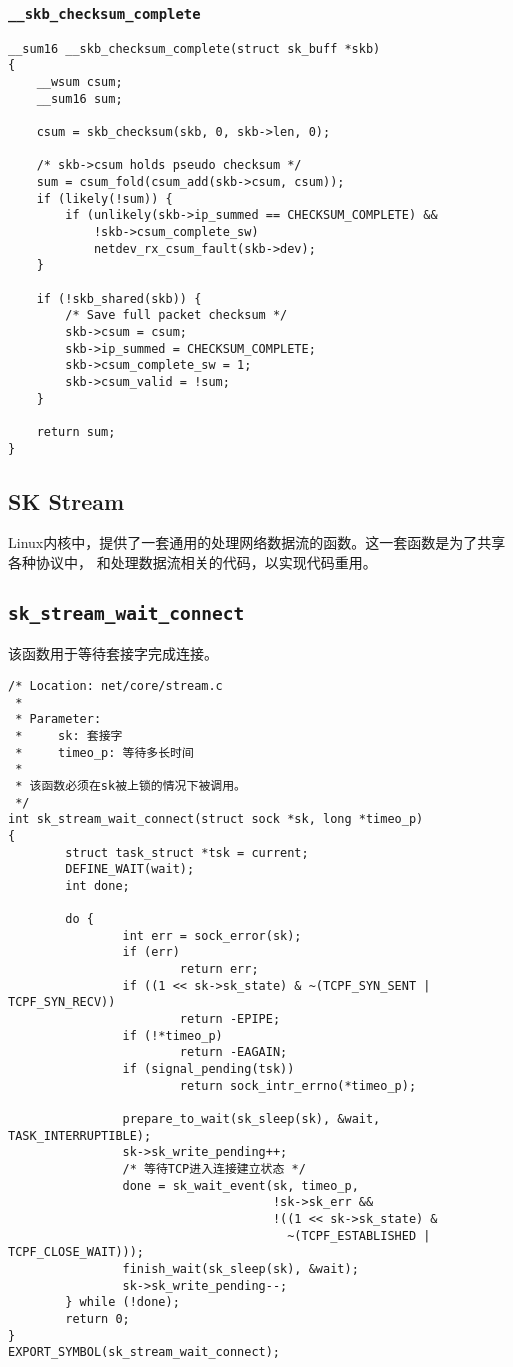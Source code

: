 			\subsubsection{\texttt{__skb_checksum_complete}}
\begin{verbatim}
__sum16 __skb_checksum_complete(struct sk_buff *skb)
{
	__wsum csum;
	__sum16 sum;

	csum = skb_checksum(skb, 0, skb->len, 0);

	/* skb->csum holds pseudo checksum */
	sum = csum_fold(csum_add(skb->csum, csum));
	if (likely(!sum)) {
		if (unlikely(skb->ip_summed == CHECKSUM_COMPLETE) &&
		    !skb->csum_complete_sw)
			netdev_rx_csum_fault(skb->dev);
	}

	if (!skb_shared(skb)) {
		/* Save full packet checksum */
		skb->csum = csum;
		skb->ip_summed = CHECKSUM_COMPLETE;
		skb->csum_complete_sw = 1;
		skb->csum_valid = !sum;
	}

	return sum;
}
\end{verbatim}	
		\subsection{SK Stream}
Linux内核中，提供了一套通用的处理网络数据流的函数。这一套函数是为了共享各种协议中，
和处理数据流相关的代码，以实现代码重用。
\subsection{\texttt{sk_stream_wait_connect}}
该函数用于等待套接字完成连接。
\begin{verbatim}
/* Location: net/core/stream.c
 *
 * Parameter:
 *     sk: 套接字
 *     timeo_p: 等待多长时间
 *
 * 该函数必须在sk被上锁的情况下被调用。
 */
int sk_stream_wait_connect(struct sock *sk, long *timeo_p)
{
        struct task_struct *tsk = current;
        DEFINE_WAIT(wait);
        int done;

        do {
                int err = sock_error(sk);
                if (err)
                        return err;
                if ((1 << sk->sk_state) & ~(TCPF_SYN_SENT | TCPF_SYN_RECV))
                        return -EPIPE;
                if (!*timeo_p)
                        return -EAGAIN;
                if (signal_pending(tsk))
                        return sock_intr_errno(*timeo_p);

                prepare_to_wait(sk_sleep(sk), &wait, TASK_INTERRUPTIBLE);
                sk->sk_write_pending++;
                /* 等待TCP进入连接建立状态 */
                done = sk_wait_event(sk, timeo_p,
                                     !sk->sk_err &&
                                     !((1 << sk->sk_state) &
                                       ~(TCPF_ESTABLISHED | TCPF_CLOSE_WAIT)));
                finish_wait(sk_sleep(sk), &wait);
                sk->sk_write_pending--;
        } while (!done);
        return 0;
}
EXPORT_SYMBOL(sk_stream_wait_connect);
\end{verbatim}


